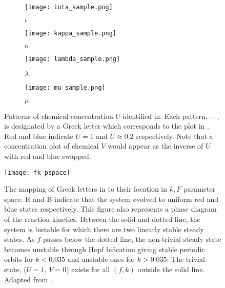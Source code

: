 \begin{figure}
        \begin{subfigure}[b]{0.2\textwidth}
                \texttt{[image: iota\_sample.png]}
                \caption{$\iota$}
                \label{fig:iota_sample}
        \end{subfigure}
         \begin{subfigure}[b]{0.2\textwidth}
                \texttt{[image: kappa\_sample.png]}
                \caption{$\kappa$}
                \label{fig:kappa_sample}
        \end{subfigure}
        \begin{subfigure}[b]{0.2\textwidth}
                \texttt{[image: lambda\_sample.png]}
                \caption{$\lambda$}
                \label{fig:lambda_sample}
        \end{subfigure}
        \begin{subfigure}[b]{0.2\textwidth}
                \texttt{[image: mu\_sample.png]}
                \caption{$\mu$}
                \label{fig:mu_sample}
        \end{subfigure} \hfill
        \caption{Patterns of chemical concentration $U$ identified in. Each pattern, ---, is designated by a Greek letter which corresponds to the plot in . Red and blue indicate $U=1$ and $U\approx 0.2$ respectively. Note that a concentration plot of chemical $V$ would appear as the inverse of $U$ with red and blue swapped.}\label{fig:pearson}
\end{figure}

\begin{figure}[h]
	\centering
	\texttt{[image: fk\_pspace]}
	\caption{The mapping of Greek letters in  to their location in $k, F$ parameter space. R and B indicate that the system evolved to uniform red and blue states respectively. This figure also represents a phase diagram of the reaction kinetics. Between the solid and dotted line, the system is bistable for which there are two linearly stable steady states. As $f$ passes below the dotted line, the non-trivial steady state becomes unstable through Hopf bification giving stable periodic orbits for $k < 0.035$ and unstable ones for $k > 0.035$. The trivial state, ($U =1$, $V = 0$) exists for all $(f,k)$ outside the solid line. Adapted from \protect{}.} \label{fig:fk_pspace}
\end{figure}

